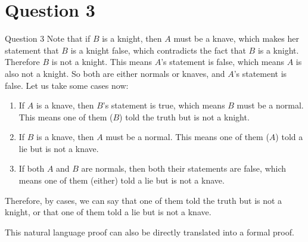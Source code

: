 \documentclass{beamer}
\begin{document}
    \section{Question 3}
    {
        \begin{frame}{Question 3}
            Note that if $B$ is a knight, then $A$ must be a knave, which makes her statement that $B$ is a knight false, which contradicts the fact that $B$ is a knight. Therefore $B$ is not a knight. This means $A$'s statement is false, which means $A$ is also not a knight. So both are either normals or knaves, and $A$'s statement is false. Let us take some cases now:
            \begin{enumerate}
                \item If $A$ is a knave, then $B$'s statement is true, which means $B$ must be a normal. This means one of them ($B$) told the truth but is not a knight.
                \item If $B$ is a knave, then $A$ must be a normal. This means one of them ($A$) told a lie but is not a knave.
                \item If both $A$ and $B$ are normals, then both their statements are false, which means one of them (either) told a lie but is not a knave.
            \end{enumerate}
            Therefore, by cases, we can say that one of them told the truth but is not a knight, or that one of them told a lie but is not a knave.

            This natural language proof can also be directly translated into a formal proof.
        \end{frame}
    }
\end{document}
